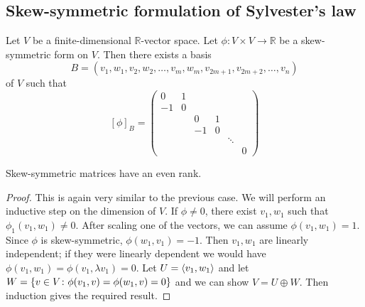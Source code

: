 \subsection{Skew-symmetric formulation of Sylvester's law}
\begin{theorem}
	Let \( V \) be a finite-dimensional \( \mathbb R \)-vector space.
	Let \( \phi \colon V \times V \to \mathbb R \) be a skew-symmetric form on \( V \).
	Then there exists a basis
	\[
		B = (v_1, w_1, v_2, w_2, \dots, v_m, w_m, v_{2m+1}, v_{2m+2}, \dots, v_n)
	\]
	of \( V \) such that
	\[
		[\phi]_B = \begin{pmatrix}
			0  & 1                       \\
			-1 & 0                       \\
			   &   & 0  & 1              \\
			   &   & -1 & 0              \\
			   &   &    &   & \ddots     \\
			   &   &    &   &        & 0
		\end{pmatrix}
	\]
\end{theorem}
\begin{corollary}
	Skew-symmetric matrices have an even rank.
\end{corollary}
\begin{proof}
	This is again very similar to the previous case.
	We will perform an inductive step on the dimension of \( V \).
	If \( \phi \neq 0 \), there exist \( v_1, w_1 \) such that \( \phi_1(v_1, w_1) \neq 0 \).
	After scaling one of the vectors, we can assume \( \phi(v_1, w_1) = 1 \).
	Since \( \phi \) is skew-symmetric, \( \phi(w_1, v_1) = -1 \).
	Then \( v_1, w_1 \) are linearly independent; if they were linearly dependent we would have \( \phi(v_1, w_1) = \phi(v_1, \lambda v_1) = 0 \).
	Let \( U = \langle{} v_1, w_1 \rangle \) and let \( W = \qty{v \in V \colon \phi(v_1, v) = \phi(w_1, v) = 0} \) and we can show \( V = U \oplus W \).
	Then induction gives the required result.
\end{proof}

